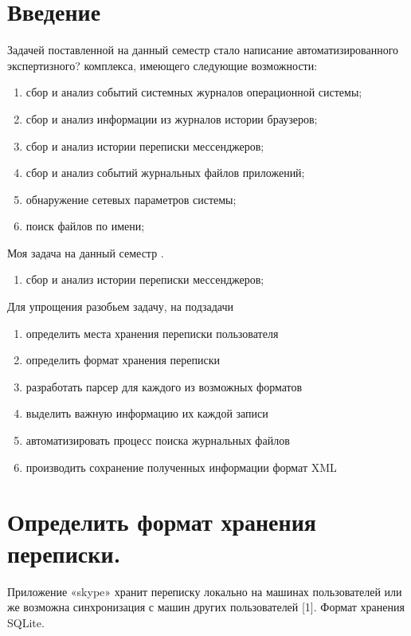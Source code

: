 \newpage

\chapter*{Введение}

Задачей поставленной на данный семестр стало написание автоматизированного экспертизного? комплекса, имеющего следующие возможности: \\

\begin{enumerate}
\item сбор и анализ событий системных журналов операционной системы;
\item сбор и анализ информации из журналов истории браузеров;
\item сбор и анализ истории переписки мессенджеров;
\item сбор и анализ событий журнальных файлов приложений;
\item обнаружение сетевых параметров системы;
\item поиск файлов по имени;
\end{enumerate}


Моя задача на данный семестр . \\

\begin{enumerate}
\item сбор и анализ истории переписки мессенджеров;
\end{enumerate}

Для упрощения разобьем задачу, на подзадачи
\begin{enumerate}
\item определить места хранения переписки пользователя
\item определить формат хранения переписки
\item разработать парсер для каждого из возможных форматов
\item выделить важную информацию их каждой записи
\item автоматизировать процесс поиска журнальных файлов
\item производить сохранение полученных информации формат XML
\end{enumerate}

\chapter*{Определить формат хранения переписки.}

Приложение «skype» хранит переписку локально на машинах пользователей или же возможна синхронизация с машин других пользователей [1]. Формат хранения SQLite. \\

